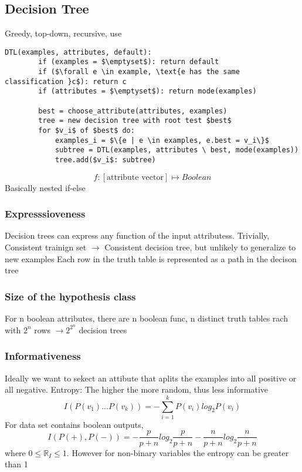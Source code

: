 \documentclass{article}
\begin{document}
\subsection[Supervised]{Decision Tree}
Greedy, top-down, recursive, use
\begin{lstlisting}[mathescape=true]
    DTL(examples, attributes, default):
        if (examples = $\emptyset$): return default
        if ($\forall e \in example, \text{e has the same classification }c$): return c
        if (attributes = $\emptyset$): return mode(examples)

        best = choose_attribute(attributes, examples)
        tree = new decision tree with root test $best$
        for $v_i$ of $best$ do:
            examples_i = $\{e | e \in examples, e.best = v_i\}$
            subtree = DTL(examples, attributes \ best, mode(examples))
            tree.add($v_i$: subtree)
    \end{lstlisting}
\[f: [\text{attribute vector}] \mapsto Boolean\]
Basically nested if-else 

\subsubsection*{Expresssioveness }
Decision trees can express any function of the input attributess. Trivially, Consistent trainign set $\rightarrow$ Consistent decision tree, but unlikely to generalize to new examples\newline
Each row in the truth table is represented as a path in the decison tree 
\subsubsection*{Size of the hypothesis class}
For n boolean attributes, there are n boolean func, n distinct truth tables rach with $2^n$ rows $\rightarrow 2^{2^n}$ decision trees
\subsubsection*{Informativeness}
Ideally we want to sekect an attibute that aplits the examples into all positive or all negative.\newline
Entropy: The higher the more random, thus less informative
\[I(P(v_1)...P(v_k)) = -\sum_{i=1}^{k} P(v_i)log_2P(v_i)\]
For data set contains boolean outputs, 
\[I(P(+), P(-)) = -\frac{p}{p + n}log_2 \frac{p}{p + n} - \frac{n}{p+n}log_2\frac{n}{p+n}\]
where $0 \leq \mathbb{R}_I \leq 1$. However for non-binary variables the entropy can be greater than 1
\end{document}
